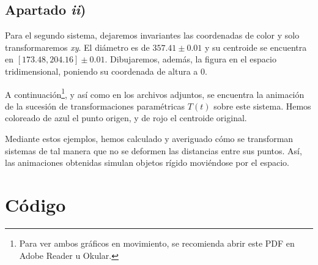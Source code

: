 \documentclass[a4paper]{article}
\begin{document}
	
	\subsection{Apartado \textit{ii})}
	Para el segundo sistema, dejaremos invariantes las coordenadas de color y solo transformaremos \textit{xy}. El diámetro es de $357.41 \pm 0.01$ y su centroide se encuentra en $[173.48, 204.16] \pm 0.01$. Dibujaremos, además, la figura en el espacio tridimensional, poniendo su coordenada de altura a 0.
	
	A continuación\footnote{Para ver ambos gráficos en movimiento, se recomienda abrir este PDF en Adobe Reader u Okular.}, y así como en los archivos adjuntos, se encuentra la animación de la sucesión de transformaciones paramétricas $T(t)$ sobre este sistema. Hemos coloreado de azul el punto origen, y de rojo el centroide original.
	
	\begin{center}
	\end{center}
	
	Mediante estos ejemplos, hemos calculado y averiguado cómo se transforman sistemas de tal manera que no se deformen las distancias entre sus puntos. Así, las animaciones obtenidas simulan objetos rígido moviéndose por el espacio.
	
	
	\newpage
	\section{Código}\label{codigo}
	
	
	
\end{document}
